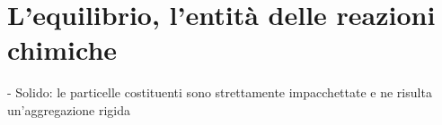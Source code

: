 \section{L'equilibrio, l'entità delle reazioni chimiche}
- Solido: le particelle costituenti sono strettamente impacchettate e ne risulta un'aggregazione rigida
